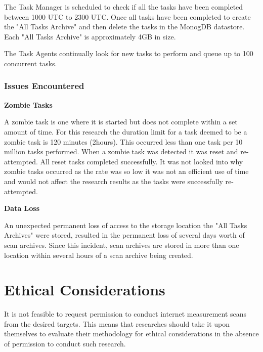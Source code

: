 \documentclass{mscreport}
\begin{document}
\vspace{0.3cm} \noindent
The Task Manager is scheduled to check if all the tasks have been completed between 1000 UTC to 2300 UTC. Once all tasks have been completed to create the "All Tasks Archive" and then delete the tasks in the MonogDB datastore. Each "All Tasks Archive" is approximately 4GB in size.

\vspace{0.3cm} \noindent
The Task Agents continually look for new tasks to perform and queue up to 100 concurrent tasks.

\subsubsection{Issues Encountered}

\textbf{Zombie Tasks}

\vspace{0.2cm} \noindent
A zombie task is one where it is started but does not complete within a set amount of time. For this research the duration limit for a task deemed to be a zombie task is 120 minutes (2hours). This occurred less than one task per 10 million tasks performed. When a zombie task was detected it was reset and re-attempted. All reset tasks completed successfully. It was not looked into why zombie tasks occurred as the rate was so low it was not an efficient use of time and would not affect the research results as the tasks were successfully re-attempted.

\vspace{0.6cm} \noindent
\textbf{Data Loss}

\vspace{0.2cm} \noindent
An unexpected permanent loss of access to the storage location the "All Tasks Archives" were stored, resulted in the permanent loss of several days worth of scan archives. Since this incident, scan archives are stored in more than one location within several hours of a scan archive being created.

\newpage

\section{Ethical Considerations}

It is not feasible to request permission to conduct internet measurement scans from the desired targets. This means that researches should take it upon themselves to evaluate their methodology for ethical considerations in the absence of permission to conduct such research.
\end{document}

